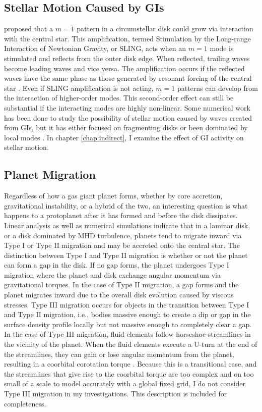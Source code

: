 \subsection{Stellar Motion Caused by GIs}\label{sec:wobbletheory}

\citet{adams1989} proposed that a $m = 1$ pattern in a circumstellar disk could grow via interaction with the central star. This amplification, termed Stimulation by the Long-range Interaction of Newtonian Gravity, or SLING, acts when an $m = 1$ mode is stimulated and reflects from the outer disk edge. When reflected, trailing waves become leading waves and vice versa. The amplification occurs if the reflected waves have the same phase as those generated by resonant forcing of the central star \citep{shu1990}. Even if SLING amplification is not acting, $m = 1$ patterns can develop from the interaction of higher-order modes. This second-order effect can still be substantial if the interacting modes are highly non-linear. Some numerical work has been done to study the possibility of stellar motion caused by waves created from GIs, but it has either focused on fragmenting disks \citep{boss1998} or been dominated by local modes \citep{rice2003a}. In chapter \ref{chap:indirect}, I examine the effect of GI activity on stellar motion.

\subsection{Planet Migration}\label{sec:migtheory}

Regardless of how a gas giant planet forms, whether by core accretion, gravitational instability, or a hybrid of the two, an interesting question is what happens to a protoplanet after it has formed and before the disk dissipates.  Linear analysis \citep{ward1997,tanaka2002} as well as numerical simulations \citep{nelson2003,nelson2004} indicate that in a laminar disk, or a disk dominated by MHD turbulence, 
planets tend to migrate inward via Type I or Type II migration and may be accreted onto the central star. The distinction between Type I and Type II migration is whether or not the planet can form a gap in the disk. If no gap forms, the planet undergoes Type I migration where the planet and disk exchange angular momentum via gravitational torques. In the case of Type II migration, a gap forms and the planet migrates inward due to the overall disk evolution caused by viscous stresses. Type III migration occurs for objects in the transition between Type I and Type II migration, i.e., bodies massive enough to create a dip or gap in the surface density profile locally but not massive enough to completely clear a gap. In the case of Type III migration, fluid elements follow horseshoe streamlines in the vicinity of the planet. When the fluid elements execute a U-turn at the end of the streamlines, they can gain or lose angular momentum from the planet, resulting in a coorbital corotation torque \citep{masset2003}. Because this is a transitional case, and the streamlines that give rise to the coorbital torque are too complex and on too small of a scale to model accurately with a global fixed grid, I do not consider Type III migration in my investigations. This description is included for completeness. 

